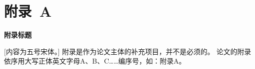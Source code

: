 
 \setlength{\baselineskip}{16pt}
\chapter{附录~A}

\begin{center}
\textbf{附录标题}
\end{center}



\indent
{}
[内容为五号宋体。] 附录是作为论文主体的补充项目，并不是必须的。
论文的附录依序用大写正体英文字母A、B、C……编序号，如：附录A。